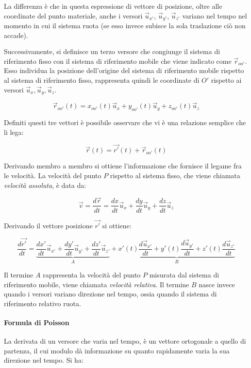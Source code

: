 La differenza è che in questa espressione di vettore di posizione, oltre alle coordinate del punto materiale, anche i versori $\vec{u}_{x'}$, $\vec{u}_{y'}$, $\vec{u}_{z'}$ variano nel tempo nel momento in cui il sistema ruota (se esso invece subisce la sola traslazione ciò non accade).

Successivamente, si definisce un terzo versore che congiunge il sistema di riferimento fisso con il sistema di riferimento mobile che viene indicato come $\vec{r}_{oo'}$. Esso individua la posizione dell'origine del sistema di riferimento mobile rispetto al sistema di riferimento fisso, rappresenta quindi le coordinate di $O'$ rispetto ai versori $\vec{u}_x, \vec{u}_y, \vec{u}_z$.

\[
	\vec{r}_{oo'}(t)=x_{oo'}(t)\vec{u}_x+y_{oo'}(t)\vec{u}_y+z_{oo'}(t)\vec{u}_z
\]

Definiti questi tre vettori è possibile osservare che vi è una relazione semplice che li lega:

\begin{equation}
	\label{relativo}
	\boxed{\vec{r}(t)=\vec{r'}(t)+\vec{r}_{oo'}(t)}
\end{equation}

Derivando membro a membro si ottiene l'informazione che fornisce il legame fra le velocità. La velocità del punto $P$ rispetto al sistema fisso, che viene chiamata \emph{velocità assoluta}, è data da:

\[
	\vec{v}=\frac{d\vec{r}}{dt}= \frac{dx}{dt}\vec{u}_x + \frac{dy}{dt}\vec{u}_y + \frac{dz}{dt}\vec{u}_z
\]

Derivando il vettore posizione $\vec{r'}$ si ottiene:

\[
	\frac{d\vec{r'}}{dt}=\underbrace{\frac{dx'}{dt}\vec{u}_{x'}+\frac{dy'}{dt}\vec{u}_{y'}+\frac{dz'}{dt}\vec{u}_{z'}}_A+ \underbrace{x'(t) \frac{d\vec{u}_{x'}}{dt}+ y'(t) \frac{d\vec{u}_{y'}}{dt}+ z'(t) \frac{d\vec{u}_{z'}}{dt}}_B
\]

Il termine $A$ rappresenta la velocità del punto $P$ misurata dal sistema di riferimento mobile, viene chiamata \emph{velocità relativa}. Il termine $B$ nasce invece quando i versori variano direzione nel tempo, ossia quando il sistema di riferimento relativo ruota.

\paragraph{Formula di Poisson} La derivata di un versore che varia nel tempo, è un vettore ortogonale a quello di partenza, il cui modulo dà informazione su quanto rapidamente varia la sua direzione nel tempo. Si ha:

